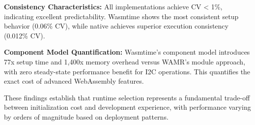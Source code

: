 \textbf{Consistency Characteristics:}
All implementations achieve CV < 1\%, indicating excellent predictability. Wasmtime shows the most consistent setup behavior (0.06\% CV), while native achieves superior execution consistency (0.012\% CV).

\textbf{Component Model Quantification:}
Wasmtime's component model introduces 77x setup time and 1,400x memory overhead versus WAMR's module approach, with zero steady-state performance benefit for I2C operations. This quantifies the exact cost of advanced WebAssembly features.

These findings establish that runtime selection represents a fundamental trade-off between initialization cost and development experience, with performance varying by orders of magnitude based on deployment patterns.


